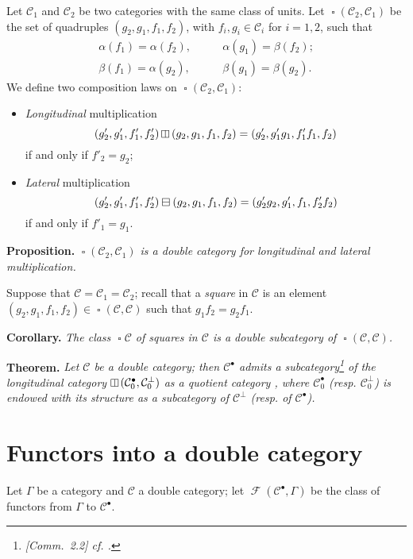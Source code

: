 \documentclass{article}
\newenvironment{itenv}[1]
  {\phantomsection\par\medskip\noindent\textbf{#1.}\itshape}
  {\par\medskip}
\newcommand{\CC}{\mathcal{C}}
\DeclareMathOperator{\sq}{\square}
\DeclareMathOperator{\vsq}{\raisebox{-.1em}{\rotatebox{90}{$\boxminus$}\,}}
\newcommand{\vmult}{\mathbin{\raisebox{-.1em}{\rotatebox{90}{$\boxminus$}}}}
\newcommand{\hmult}{\mathbin{\raisebox{-.05em}{$\boxminus$}}}
\DeclareMathOperator{\FF}{\mathcal{F}}
\begin{document}
Let $\CC_1$ and $\CC_2$ be two categories with the same class of units.
Let $\sq(\CC_2,\CC_1)$ be the set of quadruples $(g_2,g_1,f_1,f_2)$, with $f_i,g_i\in\CC_i$ for $i=1,2$, such that
\[
  \begin{aligned}
    \alpha(f_1)
    = \alpha(f_2),
    &\qquad
    \alpha(g_1)
    = \beta(f_2);
  \\\beta(f_1)
    = \alpha(g_2),
    &\qquad
    \beta(g_1)
    = \beta(g_2).
  \end{aligned}
\]
We define two composition laws on $\sq(\CC_2,\CC_1)$:
\begin{itemize}
  \item \emph{Longitudinal} multiplication
    \[
      (g'_2,g'_1,f'_1,f'_2)\vmult(g_2,g_1,f_1,f_2)
      = (g'_2,g'_1g_1,f'_1f_1,f_2)
    \]
    if and only if $f'_2=g_2$;
  \item \emph{Lateral} multiplication
    \[
      (g'_2,g'_1,f'_1,f'_2)\hmult(g_2,g_1,f_1,f_2)
      = (g'_2g_2,g'_1,f_1,f'_2f_2)
    \]
    if and only if $f'_1=g_1$.
\end{itemize}

\begin{itenv}{Proposition}
  $\sq(\CC_2,\CC_1)$ is a double category for longitudinal and lateral multiplication.
\end{itenv}

Suppose that $\CC=\CC_1=\CC_2$;
recall \cite{1} that a \emph{square} in $\CC$ is an element $(g_2,g_1,f_1,f_2)\in\sq(\CC,\CC)$ such that $g_1f_2=g_2f_1$.

\begin{itenv}{Corollary}
  The class $\sq\CC$ of squares in $\CC$ is a double subcategory of $\sq(\CC,\CC)$.
\end{itenv}

\begin{itenv}{Theorem}
  Let $\CC$ be a double category;
  then $\CC^\bullet$ admits a subcategory\footnote{\emph{[Comm.~2.2] cf. \cite[Theorem~6]{CW63}.}} of the longitudinal category $\vsq(\CC_0^\bullet,\CC_0^\perp)$ as a quotient category \cite{1}, where $\CC_0^\bullet$ (resp. $\CC_0^\perp$) is endowed with its structure as a subcategory of $\CC^\perp$ (resp. of $\CC^\bullet$).
\end{itenv}


\section{Functors into a double category}

Let $\Gamma$ be a category and $\CC$ a double category;
let $\FF(\CC^\bullet,\Gamma)$ be the class of functors from $\Gamma$ to $\CC^\bullet$.
\end{document}

